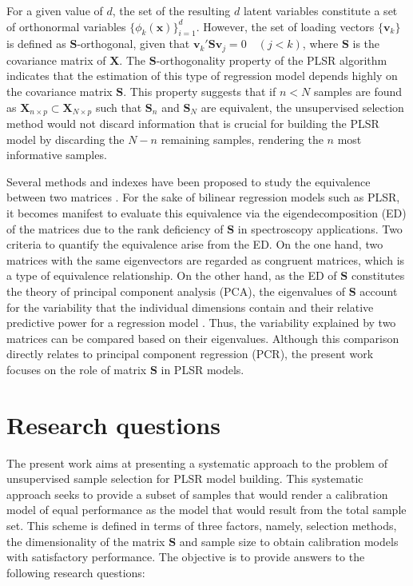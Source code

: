 \documentclass[journal=ancham,manuscript=article]{achemso}
\begin{document}
For a given value of $d$, the set of the resulting $d$ latent variables constitute a set of orthonormal variables $\{\phi_{k}(\mathbf{x})\}_{i=1}^d$. However, the set of loading vectors $\{\mathbf{v}_k\}$ is defined as $\mathbf{S}$-orthogonal, given that $\mathbf{v}_k'\mathbf{S}\mathbf{v}_j = 0 \quad (j<k)$, where $\mathbf{S}$ is the covariance matrix of $\mathbf{X}$. The $\mathbf{S}$-orthogonality property of the PLSR algorithm indicates that the estimation of this type of regression model depends highly on the covariance matrix $\mathbf{S}$. This property suggests that if $n<N$ samples are found as $\mathbf{X}_{n \times p} \subset \mathbf{X}_{N \times p}$ such that $\mathbf{S}_n$ and $\mathbf{S}_N$ are equivalent, the unsupervised selection method would not discard information that is crucial for building the PLSR model by discarding the $N-n$ remaining samples, rendering the $n$ most informative samples.

Several methods and indexes have been proposed to study the equivalence between two matrices \cite{Tomic2013}. For the sake of bilinear regression models such as PLSR, it becomes manifest to evaluate this equivalence via the eigendecomposition (ED) of the matrices due to the rank deficiency of $\mathbf{S}$ in spectroscopy applications. Two criteria to quantify the equivalence arise from the ED. On the one hand, two matrices with the same eigenvectors are regarded as congruent matrices, which is a type of equivalence relationship\cite{Horn1985}. On the other hand, as the ED of $\mathbf{S}$ constitutes the theory of principal component analysis (PCA), the eigenvalues of $\mathbf{S}$ account for the variability that the individual dimensions contain and their relative predictive power for a regression model \cite{Artemiou2013}. Thus, the variability explained by two matrices can be compared based on their eigenvalues. Although this comparison directly relates to principal component regression (PCR), the present work focuses on the role of matrix $\mathbf{S}$ in PLSR models.


\section{Research questions}

The present work aims at presenting a systematic approach to the problem of unsupervised sample selection for PLSR model building. This systematic approach seeks to provide a subset of samples that would render a calibration model of equal performance as the model that would result from the total sample set. This scheme is defined in terms of three factors, namely, selection methods, the dimensionality of the matrix $\mathbf{S}$ and sample size to obtain calibration models with satisfactory performance. The objective is to provide answers to the following research questions:
\end{document}

